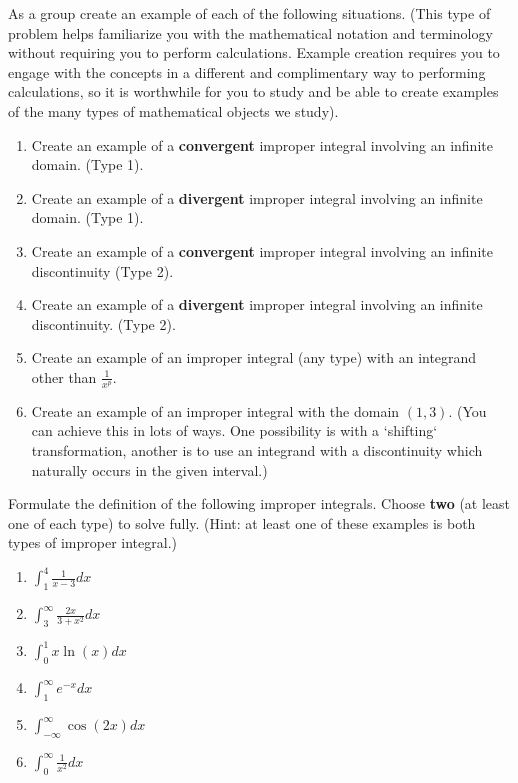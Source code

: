 \documentclass{ximera}
\begin{document}
\begin{exercise}
    As a group create an example of each of the following situations. (This type of problem helps familiarize you with the mathematical notation and terminology without requiring you to perform calculations. Example creation requires you to engage with the concepts in a different and complimentary way to performing calculations, so it is worthwhile for you to study and be able to create examples of the many types of mathematical objects we study).\\


\begin{enumerate}
\item Create an example of a {\bf{convergent}} improper integral involving an infinite domain. (Type 1).
\item Create an example of a {\bf{divergent}} improper integral involving an infinite domain. (Type 1).
\item Create an example of a {\bf{convergent}} improper integral involving an infinite discontinuity (Type 2).
\item Create an example of a {\bf{divergent}} improper integral involving an infinite discontinuity. (Type 2).
\item Create an example of an improper integral (any type) with an integrand other than $\frac{1}{x^p}$.
\item Create an example of an improper integral with the domain $(1,3)$. (You can achieve this in lots of ways. One possibility is with a `shifting` transformation, another is to use an integrand with a discontinuity which naturally occurs in the given interval.)
\end{enumerate}
\end{exercise}

\begin{exercise}
    Formulate the definition of the following improper integrals.  Choose \textbf{two} (at least one of each type) to solve fully. (Hint: at least one of these examples is both types of improper integral.)
    \begin{enumerate}
        \item $\int_1^4 \frac{1}{x-3}dx$
        \item $\int_3^\infty \frac{2x}{3+x^2}dx$
        \item $\int_0^1 x\ln(x)dx$
        \item $\int_1^\infty e^{-x}dx$
        \item $\int_{-\infty}^\infty \cos(2x)dx$
        \item $\int_0^\infty \frac{1}{x^2}dx$
    \end{enumerate}
\end{exercise}
\end{document}
